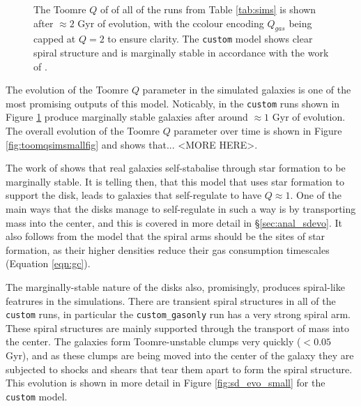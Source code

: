 \begin{figure}[!ht]
    \leavevmode\rlap{\usebox{\graphicsbox}}%
    \begin{minipage}[b]{0.63\wd\graphicsbox}%
        \caption{The Toomre $Q$ of of all of the runs from Table \ref{tab:sims} is shown after $\approx 2$ Gyr of evolution, with the ccolour encoding $Q_{gas}$ being capped at $Q=2$ to ensure clarity. The {\tt custom} model shows clear spiral structure and is marginally stable in accordance with the work of \citet{hopkins_stellar_2012}.}
        \label{fig:toomqsimbigfig}
    \end{minipage}\hspace*{0.33\wd\graphicsbox}%
\end{figure}

The evolution of the Toomre $Q$ parameter in the simulated galaxies is one of the most promising outputs of this model.
Noticably, in the {\tt custom} runs shown in Figure \ref{fig:toomqsimbigfig} produce marginally stable galaxies after around $\approx 1$ Gyr of evolution.
The overall evolution of the Toomre $Q$ parameter over time is shown in Figure \ref{fig:toomqsimsmallfig} and shows that... <MORE HERE>.

The work of \citet{hopkins_stellar_2012} shows that real galaxies self-stabalise through star formation to be marginally stable.
It is telling then, that this model that uses star formation to support the disk, leads to galaxies that self-regulate to have $Q\approx1$.
One of the main ways that the disks manage to self-regulate in such a way is by transporting mass into the center, and this is covered in more detail in \S \ref{sec:anal_sdevo}.
It also follows from the model that the spiral arms should be the sites of star formation, as their higher densities reduce their gas consumption timescales (Equation \ref{eqn:gc}).

The marginally-stable nature of the disks also, promisingly, produces spiral-like featrures in the simulations.
There are transient spiral structures in all of the {\tt custom} runs, in particular the {\tt custom\_gasonly} run has a very strong spiral arm.
These spiral structures are mainly supported through the transport of mass into the center.
The galaxies form Toomre-unstable clumps very quickly ($<0.05$ Gyr), and as these clumps are being moved into the center of the galaxy they are subjected to shocks and shears that tear them apart to form the spiral structure.
This evolution is shown in more detail in Figure \ref{fig:sd_evo_small} for the {\tt custom} model.

